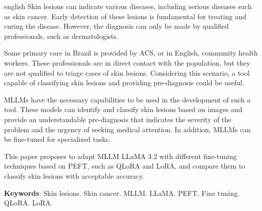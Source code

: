 \begin{resumo}[Abstract]
	\SingleSpacing
	\begin{otherlanguage*}{english}
		Skin lesions can indicate various diseases, including serious diseases such as skin cancer. Early detection of these lesions is fundamental for treating and
		curing the disease. However, the diagnosis can only be made by qualified professionals, such as dermatologists.

		Some primary care in Brazil is provided by \acl{ACS}, or in English, community health workers. These professionals are in direct contact with the population, but they
		are not qualified to triage cases of skin lesions. Considering this scenario, a tool capable of classifying skin lesions and providing pre-diagnosis could be
		useful.

		\aclp{MLLM} have the necessary capabilities to be used in the development of such a tool. These models can identify and classify skin lesions based on images and
		provide an understandable pre-diagnosis that indicates the severity of the problem and the urgency of seeking medical attention. In addition, \acp{MLLM} can be
		fine-tuned for specialized tasks.

		This paper proposes to adapt \ac{MLLM} \acl{LLaMA} 3.2 with different fine-tuning techniques based on \acl{PEFT}, such as \acl{QLoRA} and \acl{LoRA}, and compare
		them to classify skin lesions with acceptable accuracy.

		\textbf{Keywords}: Skin lesions. Skin cancer. MLLM. LLaMA. PEFT. Fine tuning. QLoRA. LoRA.
	\end{otherlanguage*}
\end{resumo}

{
\hypersetup{hidelinks}

\listoffigures

\imprimirlistadesiglas

\tableofcontents*
\cleardoublepage
}
